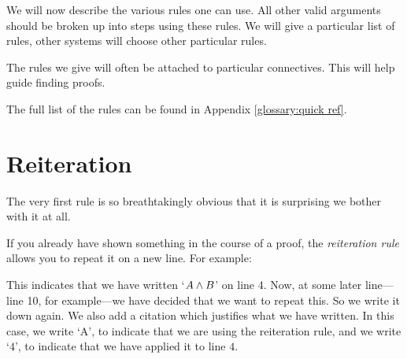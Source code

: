 %
%

We will now describe the various rules one can use. All other valid arguments should be broken up into steps using these rules. We will give a particular list of rules, other systems will choose other particular rules.

The rules we give will often be attached to particular connectives. This will help guide finding proofs.

The full list of the rules can be found in Appendix \ref{glossary:quick ref}.



\section{Reiteration}\label{s:Reiteration}
The very first rule is so breathtakingly obvious that it is surprising we bother with it at all.

If you already have shown something in the course of a proof, the \emph{reiteration rule} allows you to repeat it on a new line. For example:
\begin{fitchproof}
	\have[$\vdots$]{}{\vdots}
	 
\end{fitchproof}
This indicates that we have written `$A \mathbin{\wedge} B$' on line 4. Now, at some later line---line 10, for example---we have decided that we want to repeat this. So we write it down again. We also add a citation which justifies what we have written. In this case, we write `A', to indicate that we are using the reiteration rule, and we write `$4$', to indicate that we have applied it to line $4$.

